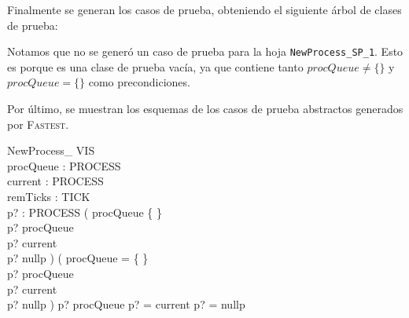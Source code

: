 \documentclass{article}
\begin{document}
Finalmente se generan los casos de prueba, obteniendo el siguiente árbol de clases de prueba:

\begin{minipage}{7cm}
\end{minipage}

Notamos que no se generó un caso de prueba para la hoja \verb|NewProcess_SP_1|. Esto es porque es una clase de prueba vacía, ya que contiene tanto $procQueue \neq \{\}$ y $procQueue = \{\}$ como precondiciones.

Por último, se muestran los esquemas de los casos de prueba abstractos generados por \textsc{Fastest}.


\begin{schema}{NewProcess\_ VIS}\\
procQueue : \nat \pinj PROCESS \\
current : PROCESS \\
remTicks : TICK \\
p? : PROCESS 
\where
( procQueue \neq \{ \} \\
p? \notin \ran procQueue \\
p? \neq current \\
p? \neq nullp ) \lor ( procQueue = \{ \} \\
p? \notin \ran procQueue \\
p? \neq current \\
p? \neq nullp ) \lor p? \in \ran procQueue \lor p? = current \lor p? = nullp
\end{schema}
\end{document}
